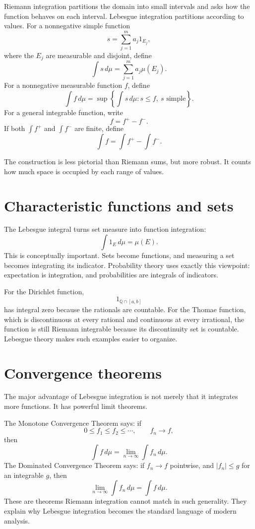 Riemann integration partitions the domain into small intervals and asks how the function behaves on each interval.  Lebesgue integration partitions according to values.  For a nonnegative simple function
\[
  s=\sum_{j=1}^m a_j1_{E_j},
\]
where the $E_j$ are measurable and disjoint, define
\[
  \int s\,d\mu=\sum_{j=1}^m a_j\mu(E_j).
\]
For a nonnegative measurable function $f$, define
\[
  \int f\,d\mu=\sup\left\{\int s\,d\mu:s\le f,\ s\text{ simple}\right\}.
\]
For a general integrable function, write
\[
  f=f^+-f^-.
\]
If both $\int f^+$ and $\int f^-$ are finite, define
\[
  \int f=\int f^+-\int f^-.
\]

The construction is less pictorial than Riemann sums, but more robust.  It counts how much space is occupied by each range of values.

\section{Characteristic functions and sets}

The Lebesgue integral turns set measure into function integration:
\[
  \int 1_E\,d\mu=\mu(E).
\]
This is conceptually important.  Sets become functions, and measuring a set becomes integrating its indicator.  Probability theory uses exactly this viewpoint: expectation is integration, and probabilities are integrals of indicators.

For the Dirichlet function,
\[
  1_{\mathbb Q\cap[a,b]}
\]
has integral zero because the rationals are countable.  For the Thomae function, which is discontinuous at every rational and continuous at every irrational, the function is still Riemann integrable because its discontinuity set is countable.  Lebesgue theory makes such examples easier to organize.

\section{Convergence theorems}

The major advantage of Lebesgue integration is not merely that it integrates more functions.  It has powerful limit theorems.

The Monotone Convergence Theorem says: if
\[
  0\le f_1\le f_2\le\cdots,
  \qquad
  f_n\to f,
\]
then
\[
  \int f\,d\mu=\lim_{n\to\infty}\int f_n\,d\mu.
\]
The Dominated Convergence Theorem says: if $f_n\to f$ pointwise, and $|f_n|\le g$ for an integrable $g$, then
\[
  \lim_{n\to\infty}\int f_n\,d\mu=\int f\,d\mu.
\]
These are theorems Riemann integration cannot match in such generality.  They explain why Lebesgue integration becomes the standard language of modern analysis.

